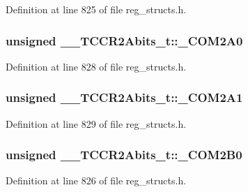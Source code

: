 Definition at line 825 of file reg\+\_\+structs.\+h.

\hypertarget{union_____t_c_c_r2_abits__t_ae37a5cba4e57d55d38b6ea71d226875e}{
\subsubsection[{\+\_\+\+C\+O\+M2\+A0}]{\setlength{\rightskip}{0pt plus 5cm}unsigned \+\_\+\+\_\+\+T\+C\+C\+R2\+Abits\+\_\+t\+::\+\_\+\+C\+O\+M2\+A0}}\label{union_____t_c_c_r2_abits__t_ae37a5cba4e57d55d38b6ea71d226875e}


Definition at line 828 of file reg\+\_\+structs.\+h.

\hypertarget{union_____t_c_c_r2_abits__t_a30c18c763e63ba9324e09a3008a3040d}{
\subsubsection[{\+\_\+\+C\+O\+M2\+A1}]{\setlength{\rightskip}{0pt plus 5cm}unsigned \+\_\+\+\_\+\+T\+C\+C\+R2\+Abits\+\_\+t\+::\+\_\+\+C\+O\+M2\+A1}}\label{union_____t_c_c_r2_abits__t_a30c18c763e63ba9324e09a3008a3040d}


Definition at line 829 of file reg\+\_\+structs.\+h.

\hypertarget{union_____t_c_c_r2_abits__t_aa8802d30ff7fa18df0c556ca6317ffb6}{
\subsubsection[{\+\_\+\+C\+O\+M2\+B0}]{\setlength{\rightskip}{0pt plus 5cm}unsigned \+\_\+\+\_\+\+T\+C\+C\+R2\+Abits\+\_\+t\+::\+\_\+\+C\+O\+M2\+B0}}\label{union_____t_c_c_r2_abits__t_aa8802d30ff7fa18df0c556ca6317ffb6}


Definition at line 826 of file reg\+\_\+structs.\+h.

